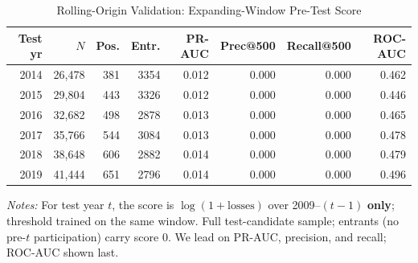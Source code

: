 \begin{table}[htbp]\centering
\caption{Rolling-Origin Validation: Expanding-Window Pre-Test Score}
\label{tab:rolling_origin}
\footnotesize
\begin{tabular}{rrrrrrrr}
\toprule
Test yr & $N$ & Pos. & Entr. & PR-AUC & Prec@500 & Recall@500 & ROC-AUC \\
\midrule
2014 & 26,478 & 381 & 3354 & 0.012 & 0.000 & 0.000 & 0.462 \\
2015 & 29,804 & 443 & 3326 & 0.012 & 0.000 & 0.000 & 0.446 \\
2016 & 32,682 & 498 & 2878 & 0.013 & 0.000 & 0.000 & 0.465 \\
2017 & 35,766 & 544 & 3084 & 0.013 & 0.000 & 0.000 & 0.478 \\
2018 & 38,648 & 606 & 2882 & 0.014 & 0.000 & 0.000 & 0.479 \\
2019 & 41,444 & 651 & 2796 & 0.014 & 0.000 & 0.000 & 0.496 \\
\bottomrule
\end{tabular}
\begin{minipage}{\linewidth}\vspace{2pt}\footnotesize
\textit{Notes:} For test year $t$, the score is $\log(1+\text{losses})$ over 2009--$(t{-}1)$ \textbf{only}; threshold trained on the same window. Full test-candidate sample; entrants (no pre-$t$ participation) carry score 0. We lead on PR-AUC, precision, and recall; ROC-AUC shown last.
\end{minipage}
\end{table}

